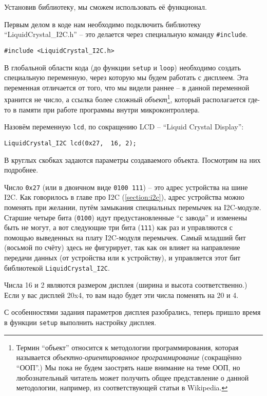 \documentclass[../sparc.tex]{subfiles}
\begin{document}
Установив библиотеку, мы сможем использовать её функционал.

Первым делом в коде нам необходимо подключить библиотеку
``LiquidCrystal\_I2C.h'' -- это делается через специальную команду
\texttt{\#include}.

\begin{verbatim}
#include <LiquidCrystal_I2C.h>
\end{verbatim}

В глобальной области кода (до функции \texttt{setup} и \texttt{loop}) необходимо
создать специальную переменную, через которую мы будем работать с дисплеем. Эта
переменная отличается от того, что мы видели раннее -- в данной переменной
хранится не число, а ссылка более сложный \emph{объект}\footnote{Термин
``объект'' относится к методологии программирования, которая называется
\emph{объектно-ориентированное программирование} (сокращённо ``ООП''.)  Мы пока
не будем заострять наше внимание на теме ООП, но любознательный читатель может
получить общее представление о данной методологии, например, из соответствующей
статьи в Wikipedia.}, который располагается где-то в памяти при работе программы
внутри микроконтроллера.

Назовём переменную \texttt{lcd}, по сокращению \gls{LCD} -- ``Liquid Crystal
Display'':

\begin{verbatim}
LiquidCrystal_I2C lcd(0x27,  16, 2);
\end{verbatim}

В круглых скобках задаются параметры создаваемого объекта.  Посмотрим на них
подробнее.

Число \texttt{0x27} (или в двоичном виде \texttt{0100 111}) -- это адрес
устройства на шине I2C.  Как говорилось в главе про I2C (\ref{section:i2c}),
адрес устройства можно поменять при желании, путём замыкания специальных
перемычек на I2C-модуле.  Старшие четыре бита (\texttt{0100}) идут
предустановленные ``с завода'' и изменены быть не могут, а вот следующие три
бита (\texttt{111}) как раз и управляются с помощью выведенных на плату
I2C-модуля перемычек.  Самый младший бит (восьмой по счёту) здесь не фигурирует,
так как он влияет на направление передачи данных (от устройства или к
устройству), и управляется этот бит библиотекой \texttt{LiquidCrystal\_I2C}.

Числа 16 и 2 являются размером дисплея (ширина и высота соответственно.)  Если у
вас дисплей 20x4, то вам надо будет эти числа поменять на 20 и 4.

С особенностями задания параметров дисплея разобрались, теперь пришло время в
функции \texttt{setup} выполнить настройку дисплея.
\end{document}
